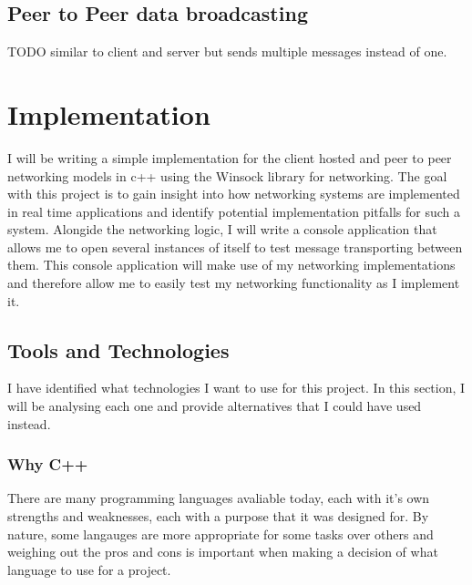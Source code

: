 
\newpage


\subsection{Peer to Peer data broadcasting}
TODO similar to client and server but sends multiple messages instead of one.


\newpage


\section{Implementation}
I will be writing a simple implementation for the client hosted and peer to peer networking models in c++ using the Winsock library for networking. The goal with this project is to gain insight into how networking systems are implemented in real time applications and identify potential implementation pitfalls for such a system. Alongide the networking logic, I will write a console application that allows me to open several instances of itself to test message transporting between them. This console application will make use of my networking implementations and therefore allow me to easily test my networking functionality as I implement it.

\subsection{Tools and Technologies}
I have identified what technologies I want to use for this project. In this section, I will be analysing each one and provide alternatives that I could have used instead.

\subsubsection{Why C++}
There are many programming languages avaliable today, each with it's own strengths and weaknesses, each with a purpose that it was designed for. By nature, some langauges are more appropriate for some tasks over others and weighing out the pros and cons is important when making a decision of what language to use for a project.

